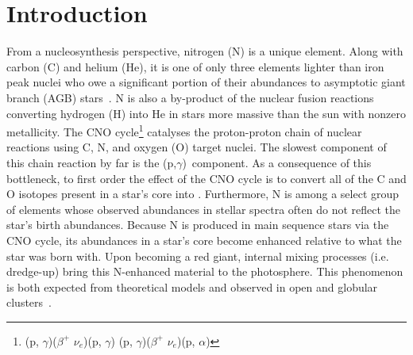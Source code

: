 \documentclass[ms.tex]{subfiles}
\begin{document}
\section{Introduction}
\label{sec:intro}

From a nucleosynthesis perspective, nitrogen (N) is a unique element.
Along with carbon (C) and helium (He), it is one of only three elements lighter
than iron peak nuclei who owe a significant portion of their abundances to
asymptotic giant branch (AGB) stars~\citep{Johnson2019}.
N is also a by-product of the nuclear fusion reactions converting hydrogen (H)
into He in stars more massive than the sun with nonzero metallicity.
The CNO cycle\footnote{
	\Ctwelve(p, $\gamma$)\Nthirteen($\beta^+$ $\nu_e$)\Cthirteen(p, $\gamma$)
	\Nfourteen(p, $\gamma$)\Ofifteen($\beta^+$ $\nu_e$)\Nfifteen(p, $\alpha$)
	\Ctwelve
} catalyses the proton-proton chain of nuclear reactions
\citep*[e.g.][]{Suliga2020} using C, N, and oxygen (O) target nuclei.
The slowest component of this chain reaction by far is the
\Nfourteen(p,$\gamma$)\Ofifteen~component.
As a consequence of this bottleneck, to first order the effect of the CNO cycle
is to convert all of the C and O isotopes present in a star's core into
\Nfourteen.
Furthermore, N is among a select group of elements whose observed abundances
in stellar spectra often do not reflect the star's birth abundances.
Because N is produced in main sequence stars via the CNO cycle, its abundances
in a star's core become enhanced relative to what the star was born with.
Upon becoming a red giant, internal mixing processes (i.e. dredge-up) bring this
N-enhanced material to the photosphere.
This phenomenon is both expected from theoretical models and observed in open
and globular clusters~\citep{Gilroy1989, Korn2007, Lind2008, Souto2018,
Souto2019, Vincenzo2021}.
\end{document}
